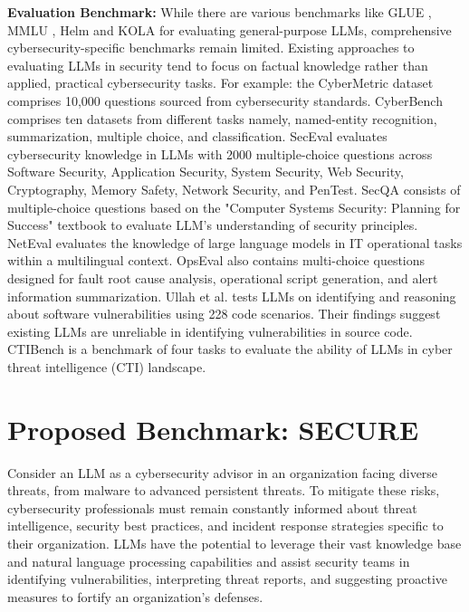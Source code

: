 \documentclass[conference]{IEEEtran}
\begin{document}
\textbf{Evaluation Benchmark:} While there are various benchmarks like GLUE \cite{wang2018glue}, MMLU \cite{hendrycks2020measuring}, Helm \cite{liang2022holistic} and KOLA \cite{yu2023kola}  for evaluating general-purpose LLMs, comprehensive cybersecurity-specific benchmarks remain limited. Existing approaches to evaluating LLMs in security tend to focus on factual knowledge rather than applied, practical cybersecurity tasks. For example: the CyberMetric dataset \cite{tihanyi2024cybermetric} comprises 10,000 questions sourced from cybersecurity standards. CyberBench \cite{liucyberbench} comprises ten datasets from different tasks namely, named-entity recognition, summarization, multiple choice, and classification. SecEval \cite{li2023seceval} evaluates cybersecurity knowledge in LLMs with 2000 multiple-choice questions across Software Security, Application Security, System Security, Web Security, Cryptography, Memory Safety, Network Security, and PenTest. SecQA \cite{liu2023secqa} consists of multiple-choice questions based on the "Computer Systems Security: Planning for Success" textbook to evaluate LLM's understanding of security principles. NetEval \cite{miao2023empirical} evaluates the knowledge of large language models in IT operational tasks within a multilingual context. OpsEval \cite{liu2023opseval} also contains multi-choice questions designed for fault root cause analysis, operational script generation, and alert information summarization. Ullah et al. \cite{ullah2024llms} tests LLMs on identifying and reasoning about software vulnerabilities using 228 code scenarios. Their findings suggest existing LLMs are unreliable in identifying vulnerabilities in source code. CTIBench \cite{alam2024ctibench} is a benchmark of four tasks to evaluate the ability of LLMs in cyber threat intelligence (CTI) landscape.

\section{Proposed Benchmark: SECURE}\label{sec:benchmark}
Consider an LLM as a cybersecurity advisor in an organization facing diverse threats, from malware to advanced persistent threats. To mitigate these risks, cybersecurity professionals must remain constantly informed about threat intelligence, security best practices, and incident response strategies specific to their organization. LLMs have the potential to leverage their vast knowledge base and natural language processing capabilities and assist security teams in identifying vulnerabilities, interpreting threat reports, and suggesting proactive measures to fortify an organization's defenses. 
\end{document}
